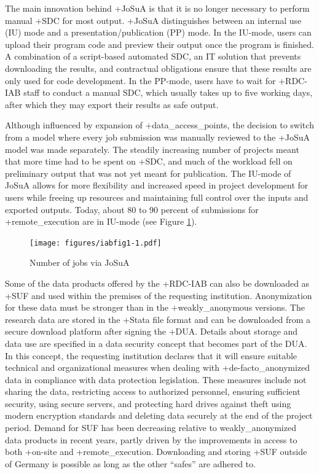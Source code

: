 \documentclass[
]{WileySix}
\begin{document}
The main innovation behind +JoSuA\textbar{} is that it is no longer necessary to perform manual +SDC\textbar{} for most output. +JoSuA\textbar{} distinguishes between an internal use (IU) mode and a presentation/publication (PP) mode. In the IU-mode, users can upload their program code and preview their output once the program is finished. A combination of a script-based automated SDC, an IT solution that prevents downloading the results, and contractual obligations ensure that these results are only used for code development. In the PP-mode, users have to wait for +RDC-IAB\textbar{} staff to conduct a manual SDC, which usually takes up to five working days, after which they may export their results as safe output.

Although influenced by expansion of +data\_access\_points\textbar, the decision to switch from a model where every job submission was manually reviewed to the +JoSuA\textbar{} model was made separately. The steadily increasing number of projects meant that more time had to be spent on +SDC\textbar, and much of the workload fell on preliminary output that was not yet meant for publication. The IU-mode of JoSuA allows for more flexibility and increased speed in project development for users while freeing up resources and maintaining full control over the inputs and exported outputs. Today, about 80 to 90 percent of submissions for +remote\_execution\textbar{} are in IU-mode (see Figure \ref{fig:iabfig1}).

\begin{figure}
\centering
\texttt{[image: figures/iabfig1-1.pdf]}
\caption{\label{fig:iabfig1}Number of jobs via JoSuA}
\end{figure}

Some of the data products offered by the +RDC-IAB\textbar{} can also be downloaded as +SUF\textbar{} and used within the premises of the requesting institution. Anonymization for these data must be stronger than in the +weakly\_anonymous\textbar{} versions. The research data are stored in the +Stata\textbar{} file format and can be downloaded from a secure download platform after signing the +DUA\textbar. Details about storage and data use are specified in a data security concept that becomes part of the DUA. In this concept, the requesting institution declares that it will ensure suitable technical and organizational measures when dealing with +de-facto\_anonymized\textbar{} data in compliance with data protection legislation. These measures include not sharing the data, restricting access to authorized personnel, ensuring sufficient security, using secure servers, and protecting hard drives against theft using modern encryption standards and deleting data securely at the end of the project period. Demand for SUF has been decreasing relative to weakly\_anonymized data products in recent years, partly driven by the improvements in access to both +on-site\textbar{} and +remote\_execution\textbar. Downloading and storing +SUF\textbar{} outside of Germany is possible as long as the other ``safes'' are adhered to.
\end{document}
